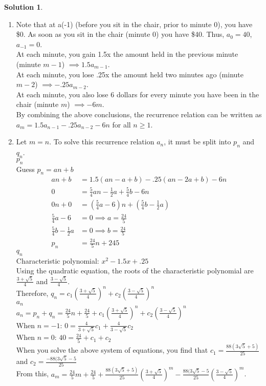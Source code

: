 \documentclass{article}
\theoremstyle{definition}
\newtheorem*{solution}{Solution}
\begin{document}
\begin{solution}\text{ \\}
\begin{enumerate}[label = \alph*)]
    \item 
    Note that at a(-1) (before you sit in the chair, prior to minute 0), you have \$0. As soon as you sit in the chair (minute 0) you have \$40. Thus, $a_0=40$, $a_{-1}=0$.\\
    At each minute, you gain 1.5x the amount held in the previous minute (minute $m-1$) $\implies 1.5a_{m-1}$.\\
    At each minute, you lose .25x the amount held two minutes ago (minute $m-2$) $\implies -.25a_{m-2}$.\\
    At each minute, you also lose 6 dollars for every minute you have been in the chair (minute $m$) $\implies -6m$.\\
    By combining the above conclusions, the recurrence relation can be written as $a_m = 1.5a_{n-1}-.25a_{n-2}-6n$ for all $n\ge 1$.
    
    \item
    Let $m=n$. To solve this recurrence relation $a_n$, it must be split into $p_n$ and $q_n$.\\
    \textbf{$p_n$}\\
    Guess $p_n = an+b$
    \begin{align*}
        an+b&=1.5(an-a+b)-.25(an-2a+b)-6n\\
        0&=\frac{5}{4}an-\frac{1}{2}a+\frac{5}{4}b-6n\\
        0n+0&=(\frac{5}{4}a-6)n + (\frac{5}{4}b-\frac{1}{2}a)\\
        \frac{5}{4}a-6&=0 \implies a=\frac{24}{5}\\
        \frac{5}{4}b-\frac{1}{2}a&=0 \implies b=\frac{24}{5}\\
        p_n&=\frac{24}{5}n+{24}{5}
    \end{align*}
    \textbf{$q_n$}\\
    Characteristic polynomial: $x^2-1.5x+.25$\\
    Using the quadratic equation, the roots of the characteristic polynomial are $\frac{3+\sqrt{5}}{4}$ and $\frac{3-\sqrt{5}}{4}$.\\
    Therefore, $q_n = c_1(\frac{3+\sqrt{5}}{4})^n+c_2(\frac{3-\sqrt{5}}{4})^n$\\
    \textbf{$a_n$}\\
    $a_n = p_n + q_n = \frac{24}{5}n+\frac{24}{5}+c_1(\frac{3+\sqrt{5}}{4})^n+c_2(\frac{3-\sqrt{5}}{4})^n$\\
    When $n=-1$: $0=\frac{4}{3+\sqrt{5}}c_1+\frac{4}{3-\sqrt{5}}c_2$\\
    When $n=0$: $40=\frac{24}{5}+c_1+c_2$\\
    When you solve the above system of equations, you find that $c_1=\frac{88(3\sqrt{5}+5)}{25}$ and $c_2=\frac{-88(3\sqrt{5}-5}{25}$\\
    From this, $a_m = \frac{24}{5}m+\frac{24}{5}+\frac{88(3\sqrt{5}+5)}{25}(\frac{3+\sqrt{5}}{4})^m - \frac{88(3\sqrt{5}-5}{25}(\frac{3-\sqrt{5}}{4})^m$.
    

\end{enumerate}
\end{solution}
\end{document}

